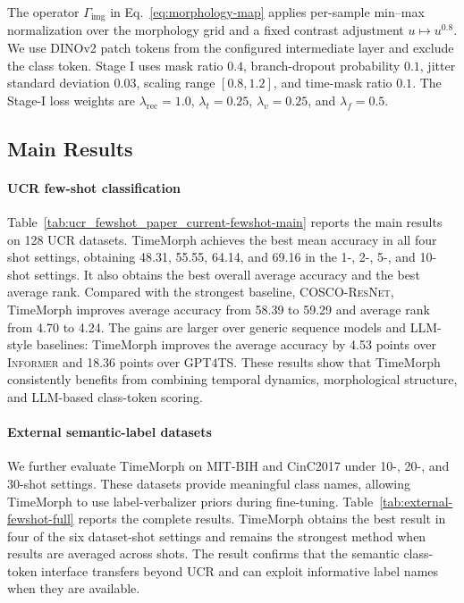 \documentclass[10pt,journal,compsoc]{IEEEtran}
\begin{document}
The operator $\Gamma_{\mathrm{img}}$ in Eq.~\ref{eq:morphology-map} applies per-sample min--max normalization over the morphology grid and a fixed contrast adjustment $u\mapsto u^{0.8}$.
We use DINOv2 patch tokens from the configured intermediate layer and exclude the class token.
Stage I uses mask ratio $0.4$, branch-dropout probability $0.1$, jitter standard deviation $0.03$, scaling range $[0.8,1.2]$, and time-mask ratio $0.1$.
The Stage-I loss weights are $\lambda_{\mathrm{rec}}=1.0$, $\lambda_t=0.25$, $\lambda_v=0.25$, and $\lambda_f=0.5$.

\subsection{Main Results}
\paragraph{UCR few-shot classification}
Table~\ref{tab:ucr_fewshot_paper_current-fewshot-main} reports the main results on 128 UCR datasets.
TimeMorph achieves the best mean accuracy in all four shot settings, obtaining 48.31, 55.55, 64.14, and 69.16 in the 1-, 2-, 5-, and 10-shot settings.
It also obtains the best overall average accuracy and the best average rank.
Compared with the strongest baseline, \textsc{COSCO-ResNet}, TimeMorph improves average accuracy from 58.39 to 59.29 and average rank from 4.70 to 4.24.
The gains are larger over generic sequence models and LLM-style baselines: TimeMorph improves the average accuracy by 4.53 points over \textsc{Informer} and 18.36 points over \textsc{GPT4TS}.
These results show that TimeMorph consistently benefits from combining temporal dynamics, morphological structure, and LLM-based class-token scoring.


\paragraph{External semantic-label datasets}
We further evaluate TimeMorph on MIT-BIH and CinC2017 under 10-, 20-, and 30-shot settings.
These datasets provide meaningful class names, allowing TimeMorph to use label-verbalizer priors during fine-tuning.
Table~\ref{tab:external-fewshot-full} reports the complete results.
TimeMorph obtains the best result in four of the six dataset-shot settings and remains the strongest method when results are averaged across shots.
The result confirms that the semantic class-token interface transfers beyond UCR and can exploit informative label names when they are available.

\end{document}
